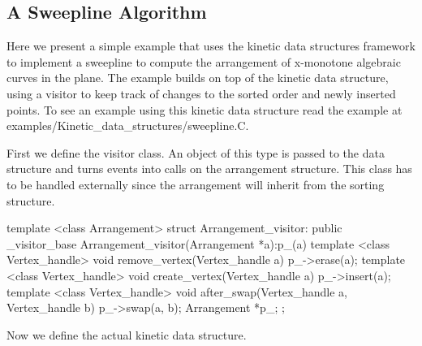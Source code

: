 

\subsection{A Sweepline Algorithm}
\label{sec:sweepline_example}

Here we present a simple example that uses the kinetic data structures
framework to implement a sweepline to compute the arrangement of
x-monotone algebraic curves in the plane. The example builds on top of
the  kinetic data structure, using a visitor
to keep track of changes to the sorted order and newly inserted
points. To see an example using this kinetic data structure read the
example at examples/Kinetic\_data\_structures/sweepline.C.

First we define the visitor class. An object of this type is passed to
the  data structure and turns events into calls on
the arrangement structure. This class has to be handled externally
since the arrangement will inherit from the sorting structure.

\begin{ccExampleCode}
template <class Arrangement>
struct Arrangement_visitor: public _visitor_base
{
  Arrangement_visitor(Arrangement *a):p_(a){}
  template <class Vertex_handle>
  void remove_vertex(Vertex_handle a) {
    p_->erase(a);
  }
  template <class Vertex_handle>
  void create_vertex(Vertex_handle a) {
    p_->insert(a);
  }
  template <class Vertex_handle>
  void after_swap(Vertex_handle a, Vertex_handle b) {
    p_->swap(a, b);
  }
  Arrangement *p_;
};

\end{ccExampleCode}

Now we define the actual kinetic data structure. 

